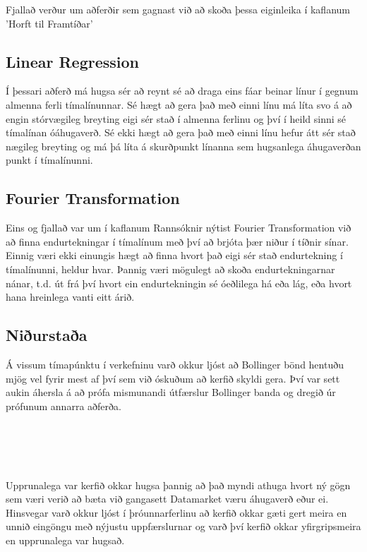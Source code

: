 \documentclass{article}
\begin{document}
Fjallað verður um aðferðir sem gagnast við að skoða þessa eiginleika í kaflanum
'Horft til Framtíðar'

\subsection{Linear Regression}
Í þessari aðferð má hugsa sér að reynt sé að draga eins fáar beinar línur í
gegnum almenna ferli tímalínunnar. Sé hægt að gera það með einni línu má líta
svo á að engin stórvægileg breyting eigi sér stað í almenna ferlinu og því í
heild sinni sé tímalínan óáhugaverð. Sé ekki hægt að gera það með einni línu
hefur átt sér stað nægileg breyting og má þá líta á skurðpunkt línanna sem
hugsanlega áhugaverðan punkt í tímalínunni.

\subsection{Fourier Transformation}
Eins og fjallað var um í kaflanum Rannsóknir nýtist Fourier
Transformation við að finna endurtekningar í tímalínum með því að brjóta þær
niður í tíðnir sínar.  
Einnig væri ekki einungis hægt að finna hvort það eigi sér stað endurtekning í
tímalínunni, heldur hvar. Þannig væri mögulegt að skoða endurtekningarnar nánar,
t.d. út frá því hvort ein endurtekningin sé óeðlilega há eða lág, eða hvort hana
hreinlega vanti eitt árið.


\subsection{Niðurstaða}
Á vissum tímapúnktu í verkefninu varð okkur ljóst að Bollinger bönd hentuðu
mjög vel fyrir mest af því sem við óskuðum að kerfið skyldi gera.
Því var sett aukin áhersla á að prófa mismunandi útfærslur Bollinger banda og dregið
úr prófunum annarra aðferða.

\hfil \\
\hfil \\
\hfil \\
\hfil \\









Upprunalega var kerfið okkar hugsa þannig að það myndi athuga hvort ný gögn sem
væri verið að bæta við gangasett Datamarket væru áhugaverð eður ei. Hinsvegar
varð okkur ljóst í þróunnarferlinu að kerfið okkar gæti gert meira en unnið
eingöngu með nýjustu uppfærslurnar og varð því kerfið okkar yfirgripsmeira en
upprunalega var hugsað.
\end{document}
